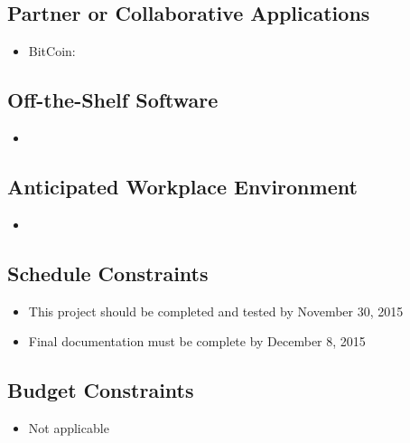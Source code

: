 \documentclass{article}
\begin{document}
\subsection{Partner or Collaborative Applications}
\begin{itemize}

\item
BitCoin: 

\end{itemize}

\subsection{Off-the-Shelf Software}
\begin{itemize}
	
\item
	
	
\end{itemize}

\subsection{Anticipated Workplace Environment}
\begin{itemize}
	
\item
	
	
\end{itemize}

\subsection{Schedule Constraints}
\begin{itemize}
	
\item
This project should be completed and tested by November 30, 2015

\item
Final documentation must be complete by December 8, 2015
	
\end{itemize}

\subsection{Budget Constraints}
\begin{itemize}
	
\item
Not applicable
	
\end{itemize}
\end{document}
